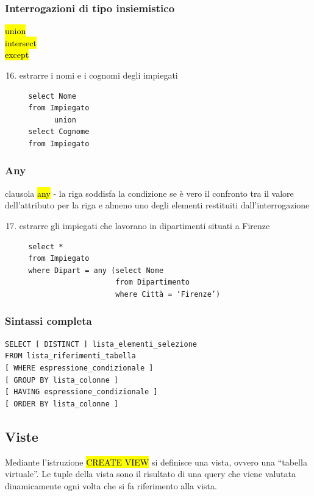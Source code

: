 \documentclass[a4paper]{article}
\begin{document}
\subsubsection{Interrogazioni di tipo insiemistico}
\hl{union}\\
\hl{intersect}\\
\hl{except}
\begin{enumerate}[leftmargin=*]
  \setcounter{enumi}{15}
  \item estrarre i nomi e i cognomi degli impiegati
  \begin{verbatim}
  select Nome
  from Impiegato
        union
  select Cognome
  from Impiegato
  \end{verbatim}
\end{enumerate}

\subsubsection{Any}
clausola \hl{any} - la riga soddisfa la condizione se è vero il confronto tra il valore dell’attributo per la riga e almeno uno degli elementi restituiti dall’interrogazione
\begin{enumerate}[leftmargin=*]
  \setcounter{enumi}{16}
  \item estrarre gli impiegati che lavorano in dipartimenti situati a Firenze
  \begin{verbatim}
  select *
  from Impiegato
  where Dipart = any (select Nome
                      from Dipartimento
                      where Città = ‘Firenze’)
  \end{verbatim}
\end{enumerate}

\subsubsection{Sintassi completa}
\begin{verbatim}
SELECT [ DISTINCT ] lista_elementi_selezione
FROM lista_riferimenti_tabella
[ WHERE espressione_condizionale ]
[ GROUP BY lista_colonne ]
[ HAVING espressione_condizionale ]
[ ORDER BY lista_colonne ]
\end{verbatim}



\subsection{Viste}
Mediante l’istruzione \hl{CREATE VIEW} si definisce una vista, ovvero una “tabella virtuale”. Le tuple della vista sono il risultato di una query che viene valutata dinamicamente ogni volta che si fa riferimento alla vista.
\end{document}
